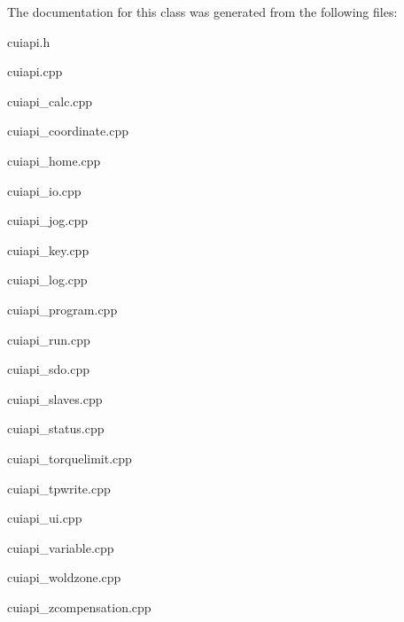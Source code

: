 The documentation for this class was generated from the following files\-:\begin{DoxyCompactItemize}
\item 
cuiapi.\-h\item 
cuiapi.\-cpp\item 
cuiapi\-\_\-calc.\-cpp\item 
cuiapi\-\_\-coordinate.\-cpp\item 
cuiapi\-\_\-home.\-cpp\item 
cuiapi\-\_\-io.\-cpp\item 
cuiapi\-\_\-jog.\-cpp\item 
cuiapi\-\_\-key.\-cpp\item 
cuiapi\-\_\-log.\-cpp\item 
cuiapi\-\_\-program.\-cpp\item 
cuiapi\-\_\-run.\-cpp\item 
cuiapi\-\_\-sdo.\-cpp\item 
cuiapi\-\_\-slaves.\-cpp\item 
cuiapi\-\_\-status.\-cpp\item 
cuiapi\-\_\-torquelimit.\-cpp\item 
cuiapi\-\_\-tpwrite.\-cpp\item 
cuiapi\-\_\-ui.\-cpp\item 
cuiapi\-\_\-variable.\-cpp\item 
cuiapi\-\_\-woldzone.\-cpp\item 
cuiapi\-\_\-zcompensation.\-cpp\end{DoxyCompactItemize}
